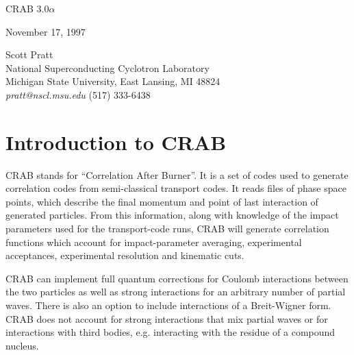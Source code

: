\documentclass[11pt]{article}
\begin{document}
\begin{center}
{\Large CRAB 3.0$\alpha$}

November 17, 1997
\end{center}

\begin{center}
{\large Scott Pratt\\
National Superconducting Cyclotron Laboratory\\
Michigan State University, East Lansing, MI  48824\\
{\it pratt@nscl.msu.edu} (517) 333-6438}
\end{center}

\section{Introduction to CRAB}

CRAB stands for ``Correlation After Burner''. It is a set of codes used to
generate correlation codes from semi-classical transport codes. It reads files
of phase space points, which describe the final momentum and point of last
interaction of generated particles. From this information, along with knowledge
of the impact parameters used for the transport-code runs, CRAB will generate
correlation functions which account for impact-parameter averaging,
experimental acceptances, experimental resolution and kinematic cuts. 

CRAB can implement full quantum corrections for Coulomb interactions between
the two particles as well as strong interactions for an arbitrary number of
partial waves. There is also an option to include interactions of a
Breit-Wigner form.  CRAB does not account for strong interactions that mix
partial waves or for interactions with third bodies, e.g. interacting with the
residue of a compound nucleus.
\end{document}
